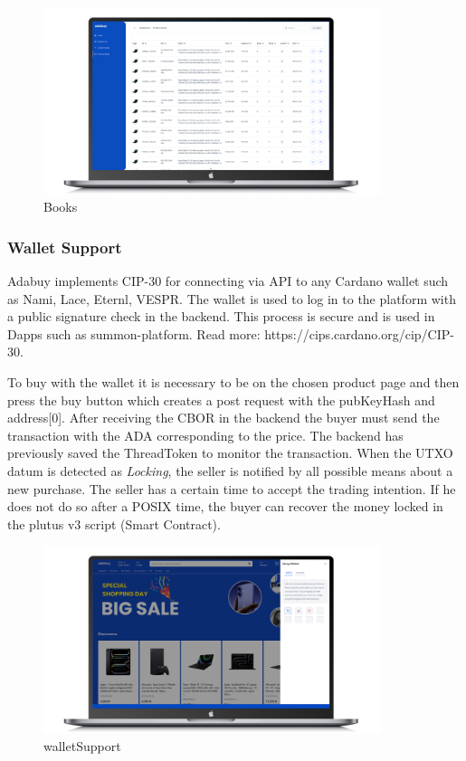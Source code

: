 \documentclass[12pt]{article}
\begin{document}
\begin{figure}[ht]
  \centering
  \includegraphics[width=0.88\textwidth, keepaspectratio]{product-books.png}
  \caption{Books}
  \label{fig:web}
\end{figure}

\subsubsection { Wallet Support } 

Adabuy implements CIP-30 for connecting via API to any Cardano wallet such as Nami, Lace, Eternl, VESPR. The wallet is used to log in to the platform with a public signature check in the backend. This process is secure and is used in Dapps such as summon-platform. Read more: https://cips.cardano.org/cip/CIP-30.

To buy with the wallet it is necessary to be on the chosen product page and then press the buy button which creates a post request with the pubKeyHash and address[0]. After receiving the CBOR in the backend the buyer must send the transaction with the ADA corresponding to the price. The backend has previously saved the ThreadToken to monitor the transaction. When the UTXO datum is detected as  \emph{Locking}, the seller is notified by all possible means about a new purchase. The seller has a certain time to accept the trading intention. If he does not do so after a POSIX time, the buyer can recover the money locked in the plutus v3 script (Smart Contract).

\begin{figure}[ht]
  \centering
  \includegraphics[width=0.88\textwidth, keepaspectratio]{walletSupport.png}
  \caption{walletSupport}
  \label{fig:web}
\end{figure}
\end{document}
